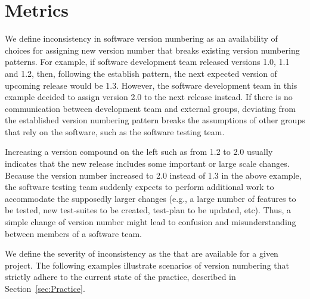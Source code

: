 \documentclass[conference]{IEEEtran}
\begin{document}
\section{Metrics}

We define inconsistency in software version numbering as an availability of choices for assigning new version number that breaks existing version numbering patterns. 
For example, if software development team released versions 1.0, 1.1 and 1.2, then, following the establish pattern, the next expected version of upcoming release would be 1.3. 
However,  the software development team in this example decided to assign version 2.0 to the next release instead.
If there is no communication between development team and external groups, deviating from the established version numbering pattern breaks the assumptions of other groups that rely on the software, such as the software testing team.

Increasing a version compound on the left such as from 1.2 to 2.0 usually indicates that the new release includes some important or large scale changes. Because the version number increased to 2.0 instead of 1.3 in the above example,  the software testing team suddenly expects to perform additional work to accommodate the supposedly larger changes (e.g., a large number of features to be tested, new test-suites to be created, test-plan to be updated, etc).
Thus, a simple change of version number might lead to confusion and misunderstanding between members of a software team.


We define the severity of inconsistency as the \choices that are available for a 
given project. The following examples illustrate scenarios of version numbering that strictly adhere to the current state of the practice, described in 
Section~\ref{sec:Practice}.\\
\end{document}
